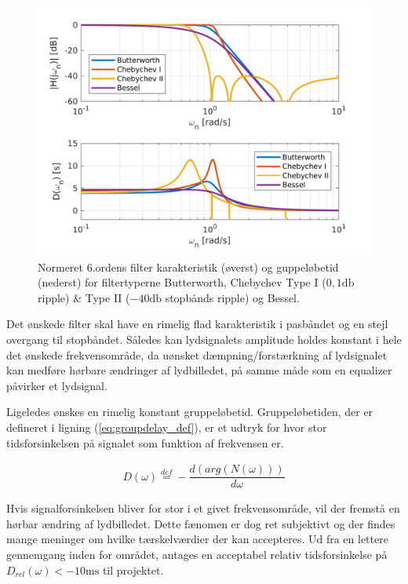 \begin{figure}[h!]
	\centering
	\includegraphics[width=1\textwidth]{matlab/filter_compare.png}
	\caption{Normeret 6.ordens filter karakteristik (øverst) og guppeløbetid (nederst) for filtertyperne Butterworth, Chebychev Type I ($0,1 \si{\decibel}$ ripple) \& Type II ($-40 \si{\decibel}$ stopbånds ripple) og Bessel.}
	\label{fig:filter_typer}
\end{figure}

Det ønskede filter skal have en rimelig flad karakteristik i pasbåndet og en stejl overgang til stopbåndet.
Således kan lydsignalets amplitude holdes konstant i hele det ønskede frekvensområde, da uønsket dæmpning/forstærkning af lydsignalet kan medføre hørbare ændringer af lydbilledet, på samme måde som en equalizer påvirker et lydsignal. 

Ligeledes ønskes en rimelig konstant gruppeløbetid. 
Gruppeløbetiden, der er defineret i ligning (\ref{eq:groupdelay_def})\cite{anfilter}, er et udtryk for hvor stor tidsforsinkelsen på signalet som funktion af frekvensen er.

\begin{align}
	D(\omega) \stackrel{def}{=} - \dfrac{d(arg(N(\omega)))}{d\omega}\label{eq:groupdelay_def}
\end{align}

Hvis signalforsinkelsen bliver for stor i et givet frekvensområde, vil der fremstå en hørbar ændring af lydbilledet.
Dette fænomen er dog ret subjektivt og der findes mange meninger om hvilke tærskelværdier der kan accepteres.
Ud fra en lettere gennemgang inden for området, antages en acceptabel relativ tidsforsinkelse på $D_{rel}(\omega) < -10 \si{\milli\second}$ til projektet.   

